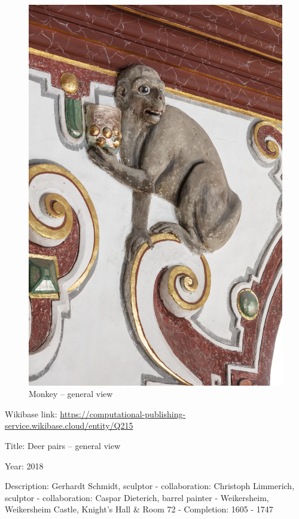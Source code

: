 \documentclass[
  letterpaper,
]{book}
\begin{document}
\begin{figure}[H]

{\centering \includegraphics{impressum_files/mediabag/fmd10005867a.jpg}

}

\caption{Monkey -- general view}

\end{figure}%

Wikibase link:
\url{https://computational-publishing-service.wikibase.cloud/entity/Q215}

Title: Deer pairs -- general view

Year: 2018

Description: Gerhardt Schmidt, sculptor - collaboration: Christoph
Limmerich, sculptor - collaboration: Caspar Dieterich, barrel painter -
Weikersheim, Weikersheim Castle, Knight's Hall \& Room 72 - Completion:
1605 - 1747
\end{document}
